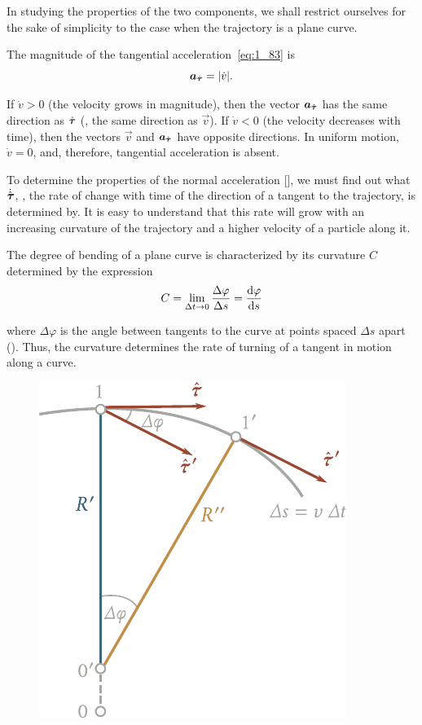 In studying the properties of the two components, we shall restrict ourselves for the sake of simplicity to the case when the trajectory is a plane curve.

The magnitude of the tangential acceleration~\eqref{eq:1_83} is
\begin{equation}\label{eq:1_85}
\boldsymbol{a}_{\hat{\boldsymbol{\tau}}} = |\dot{v}|.
\end{equation}

\noindent
If $\dot{v}>0$ (the velocity grows in magnitude), then the vector $\boldsymbol{a}_{\hat{\boldsymbol{\tau}}}$ has the same direction as $\hat{\boldsymbol{\tau}}$ (\ie, the same direction as $\vec{v}$). If $\dot{v}<0$ (the velocity decreases with time), then the vectors $\vec{v}$ and $\boldsymbol{a}_{\hat{\boldsymbol{\tau}}}$ have opposite directions. In uniform motion, $\dot{v}=0$, and, therefore, tangential acceleration is absent.

To determine the properties of the normal acceleration [], we must find out what $\dot{\hat{\boldsymbol{\tau}}}$, \ie, the rate of change with time of the direction of a tangent to the trajectory, is determined by. It is easy to understand that this rate will grow with an increasing curvature of the trajectory and a higher velocity of a particle along it.

The degree of bending of a plane curve is characterized by its curvature $C$ determined by the expression
\begin{equation}\label{eq:1_86}
C = \lim_{\Delta t\to 0} \frac{\Delta\varphi}{\Delta s} = \frac{\mathrm{d}\varphi}{\mathrm{d} s}
\end{equation}

\noindent
where $\Delta\varphi$ is the angle between tangents to the curve at points spaced $\Delta s$ apart (). Thus, the curvature determines the rate of turning of a tangent in motion along a curve.

\begin{figure}[t]
	\begin{center}
		\includegraphics[scale=1]{figures/ch_01/fig_1_27.pdf}
		\caption[]{}
		\label{fig:1_27}
	\end{center}
	\vspace{-0.7cm}
\end{figure}


